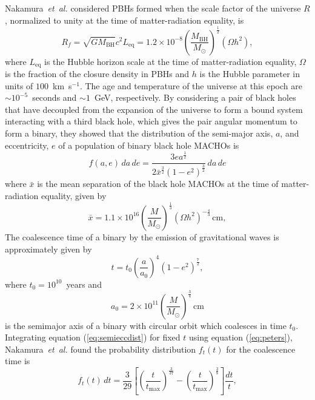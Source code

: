 Nakamura~\emph{et~al.}\cite{Nakamura:1997sm} considered PBHs formed when the
scale factor of the universe $R$, normalized to unity at the time of
matter-radiation equality, is
\begin{equation}
R_f = \sqrt{GM_\mathrm{BH}}{c^2L_\mathrm{eq}} =
1.2\times 10^{-8} \left(\frac{M_\mathrm{BH}}{M_\odot}\right)^\frac{1}{2}
(\Omega h^2),
\end{equation}
where $L_\mathrm{eq}$ is the Hubble horizon scale at the time of
matter-radiation equality, $\Omega$ is the fraction of the closure density in
PBHs and $h$ is the Hubble parameter in units of $100$~km~s$^{-1}$. The age
and temperature of the universe at this epoch are $\sim 10^{-5}$~seconds and
$\sim 1$~GeV, respectively. By considering a pair of black holes that have
decoupled from the expansion of the universe to form a bound system
interacting with a third black hole, which gives the pair angular momentum to
form a binary, they showed that the distribution of the semi-major axis, $a$,
and eccentricity, $e$ of a population of binary black hole MACHOs is
\begin{equation}
f(a,e)\, da\, de = 
\frac{ 3ea^{\frac{1}{2}} }
{ 2\bar{x}^{\frac{3}{2}} (1-e^2)^{\frac{3}{2}}  } \, da\, de 
\label{eq:semieccdist}
\end{equation}
where $\bar{x}$ is the mean separation of the black hole MACHOs at the time of
matter-radiation equality, given by
\begin{equation}
\bar{x} = 1.1 \times 10^{16} \left(\frac{M}{M_\odot}\right)^{\frac{1}{3}}
\left(\Omega h^2\right)^{-\frac{4}{3}} \,\mathrm{cm},
\end{equation}
The coalescence time of a binary by the emission of gravitational waves is
approximately given by
\cite{Peters:1964}
\begin{equation}
t = t_0 \left(\frac{a}{a_0}\right)^4 \left(1 - e^2\right)^{\frac{7}{2}},
\label{eq:peters}
\end{equation}
where $t_0 = 10^{10}$~years and
\begin{equation}
a_0 = 2 \times 10^{11}
\left(\frac{M}{M_\odot}\right)^{\frac{3}{4}}\,\mathrm{cm}
\end{equation}
is the semimajor axis of a binary with circular orbit which coalesces in time
$t_0$. Integrating equation (\ref{eq:semieccdist}) for fixed $t$ using equation
(\ref{eq:peters}), Nakamura~\emph{et~al.}\cite{Nakamura:1997sm} found the
probability distribution $f_t(t)$ for the coalescence time is
\begin{equation}
f_t(t)\,dt = \frac{3}{29}\left[
\left(\frac{t}{t_\mathrm{max}}\right)^{\frac{3}{37}} -
\left(\frac{t}{t_\mathrm{max}}\right)^{\frac{3}{8}}\right] \frac{dt}{t},
\end{equation}
